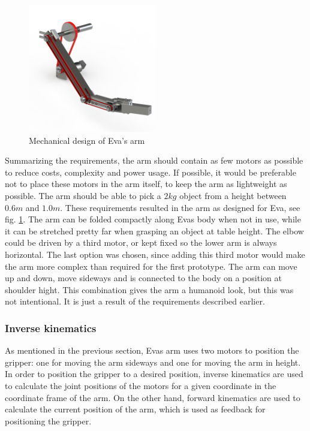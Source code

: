 \documentclass[project_eva.tex]{subfiles}
\begin{document}
\begin{figure}[h]
	\centering
	\mbox{\includegraphics[width=0.5\textwidth]{Images/armMechOverview.png}}
	\caption{Mechanical design of Eva's arm}
	\label{fig:armMechOverview}
\end{figure}

Summarizing the requirements, the arm should contain as few motors as possible to reduce costs, complexity and power usage. If possible, it would be preferable not to place these motors in the arm itself, to keep the arm as lightweight as possible. The arm should be able to pick a $2kg$ object from a height between $0.6m$ and $1.0m$. These requirements resulted in the arm as designed for Eva, see fig. \ref{fig:armMechOverview}.
The arm can be folded compactly along Eva\textquatesingle s body when not in use, while it can be stretched pretty far when grasping an object at table height. The elbow could be driven by a third motor, or kept fixed so the lower arm is always horizontal. The last option was chosen, since adding this third motor would make the arm more complex than required for the first prototype. The arm can move up and down, move sideways and is connected to the body on a position at shoulder hight. This combination gives the arm a humanoid look, but this was not intentional. It is just a result of the requirements described earlier.

\subsubsection*{Inverse kinematics}
As mentioned in the previous section, Eva\textquotesingle s arm uses two motors to position the gripper: one for moving the arm sideways and one for moving the arm in height. In order to position the gripper to a desired position, inverse kinematics are used 
to calculate the joint positions of the motors for a given coordinate in the coordinate frame of the arm. On the other 
hand, forward kinematics are used to calculate the current position of the arm, which is used as feedback for positioning 
the gripper. 
\end{document}
